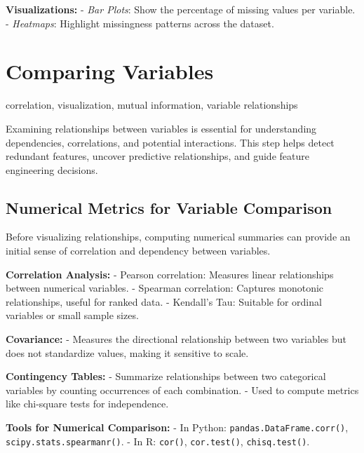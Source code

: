 \documentclass[12pt,openany]{book}
\begin{document}
\textbf{Visualizations:}  
\newline
- \textit{Bar Plots}: Show the percentage of missing values per variable.  
- \textit{Heatmaps}: Highlight missingness patterns across the dataset.  
\newline



\section{Comparing Variables}

\begin{keywordsbox}
correlation, visualization, mutual information, variable relationships
\end{keywordsbox}

Examining relationships between variables is essential for understanding dependencies, correlations, and potential interactions. This step helps detect redundant features, uncover predictive relationships, and guide feature engineering decisions. 

\subsection{Numerical Metrics for Variable Comparison}

Before visualizing relationships, computing numerical summaries can provide an initial sense of correlation and dependency between variables.
\newline

\textbf{Correlation Analysis:}
- Pearson correlation: Measures linear relationships between numerical variables.
- Spearman correlation: Captures monotonic relationships, useful for ranked data.
- Kendall’s Tau: Suitable for ordinal variables or small sample sizes.
\newline

\textbf{Covariance:}
- Measures the directional relationship between two variables but does not standardize values, making it sensitive to scale.
\newline

\textbf{Contingency Tables:}
- Summarize relationships between two categorical variables by counting occurrences of each combination.
- Used to compute metrics like chi-square tests for independence.
\newline

\textbf{Tools for Numerical Comparison:}
- In Python: \texttt{pandas.DataFrame.corr()}, \texttt{scipy.stats.spearmanr()}.
- In R: \texttt{cor()}, \texttt{cor.test()}, \texttt{chisq.test()}.
\end{document}
